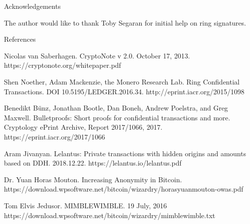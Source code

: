 \documentclass{article}
\begin{document}
Acknowledgements

The author would like to thank Toby Segaran for initial help on ring signatures.


References

Nicolas van Saberhagen. CryptoNote v 2.0. October 17, 2013. https://cryptonote.org/whitepaper.pdf

Shen Noether, Adam Mackenzie, the Monero Research Lab. Ring Confidential Transactions. DOI 10.5195/LEDGER.2016.34. http://eprint.iacr.org/2015/1098

Benedikt Bünz, Jonathan Bootle, Dan Boneh, Andrew Poelstra, and Greg Maxwell. Bulletproofs: Short proofs for confidential transactions and more. Cryptology ePrint Archive, Report 2017/1066, 2017. https://eprint.iacr.org/2017/1066

Aram Jivanyan. Lelantus: Private transactions with hidden origins and amounts based on DDH. 2018.12.22. https://lelantus.io/lelantus.pdf

Dr. Yuan Horas Mouton. Increasing Anonymity in Bitcoin. https://download.wpsoftware.net/bitcoin/wizardry/horasyuanmouton-owas.pdf

Tom Elvis Jedusor. MIMBLEWIMBLE. 19 July, 2016 https://download.wpsoftware.net/bitcoin/wizardry/mimblewimble.txt
\end{document}

